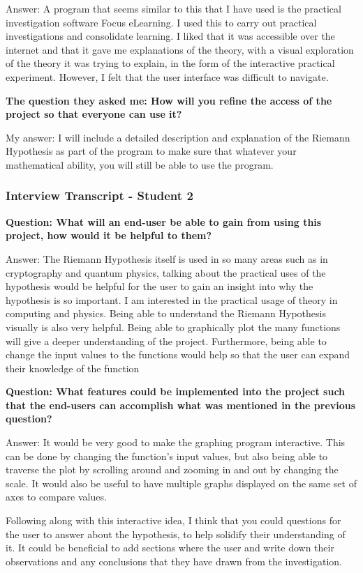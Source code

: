 \documentclass{article}
\begin{document}
Answer: A program that seems similar to this that I have used is the practical investigation software Focus eLearning. I used this to carry out practical investigations and consolidate learning. I liked that it was accessible over the internet and that it gave me explanations of the theory, with a visual exploration of the theory it was trying to explain, in the form of the interactive practical experiment. However, I felt that the user interface was difficult to navigate.

\textbf{The question they asked me: How will you refine the access of the project so that everyone can use it?}

My answer: I will include a detailed description and explanation of the Riemann Hypothesis as part of the program to make sure that whatever your mathematical ability, you will still be able to use the program.

\subsubsection{Interview Transcript - Student 2}

\textbf{Question: What will an end-user be able to gain from using this project, how would it be helpful to them?}

Answer: The Riemann Hypothesis itself is used in so many areas such as in cryptography and quantum physics, talking about the practical uses of the hypothesis would be helpful for the user to gain an insight into why the hypothesis is so important.  I am interested in the practical usage of theory in computing and physics. Being able to understand the Riemann Hypothesis visually is also very helpful. Being able to graphically plot the many functions will give a deeper understanding of the project. Furthermore, being able to change the input values to the functions would help so that the user can expand their knowledge of the function

\textbf{Question: What features could be implemented into the project such that the end-users can accomplish what was mentioned in the previous question?}

Answer: It would be very good to make the graphing program interactive. This can be done by changing the function’s input values, but also being able to traverse the plot by scrolling around and zooming in and out by changing the scale. It would also be useful to have multiple graphs displayed on the same set of axes to compare values.

Following along with this interactive idea, I think that you could questions for the user to answer about the hypothesis, to help solidify their understanding of it. It could be beneficial to add sections where the user and write down their observations and any conclusions that they have drawn from the investigation.
\end{document}
